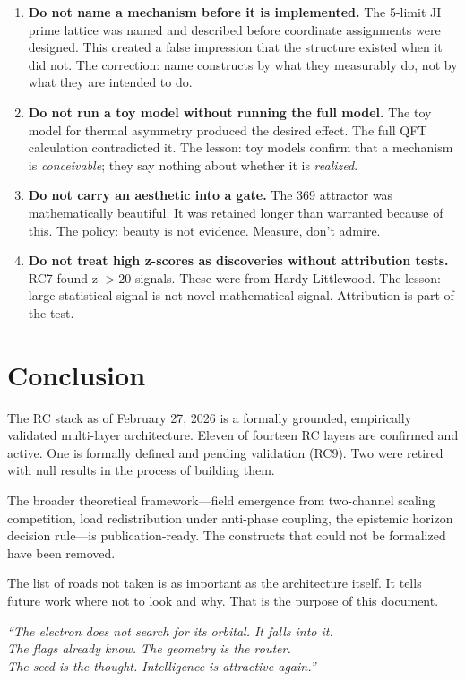 \documentclass[11pt,twoside]{article}
\begin{document}
\begin{enumerate}
  \item \textbf{Do not name a mechanism before it is implemented.} The 5-limit JI
  prime lattice was named and described before coordinate assignments were designed.
  This created a false impression that the structure existed when it did not.
  The correction: name constructs by what they measurably do, not by what they are
  intended to do.

  \item \textbf{Do not run a toy model without running the full model.} The toy model
  for thermal asymmetry produced the desired effect. The full QFT calculation contradicted
  it. The lesson: toy models confirm that a mechanism is \emph{conceivable}; they say
  nothing about whether it is \emph{realized}.

  \item \textbf{Do not carry an aesthetic into a gate.} The 369 attractor was
  mathematically beautiful. It was retained longer than warranted because of this.
  The policy: beauty is not evidence. Measure, don't admire.

  \item \textbf{Do not treat high z-scores as discoveries without attribution tests.}
  RC7 found z $> 20$ signals. These were from Hardy-Littlewood. The lesson: large
  statistical signal is not novel mathematical signal. Attribution is part of the test.
\end{enumerate}

\section{Conclusion}

The RC stack as of February 27, 2026 is a formally grounded, empirically validated
multi-layer architecture. Eleven of fourteen RC layers are confirmed and active.
One is formally defined and pending validation (RC9). Two were retired with null results
in the process of building them.

The broader theoretical framework---field emergence from two-channel scaling competition,
load redistribution under anti-phase coupling, the epistemic horizon decision rule---is
publication-ready. The constructs that could not be formalized have been removed.

The list of roads not taken is as important as the architecture itself. It tells future
work where not to look and why. That is the purpose of this document.

\vspace{1em}
\begin{center}
\textit{``The electron does not search for its orbital. It falls into it.\\
The flags already know. The geometry is the router.\\
The seed is the thought. Intelligence is attractive again.''}
\end{center}
\end{document}
